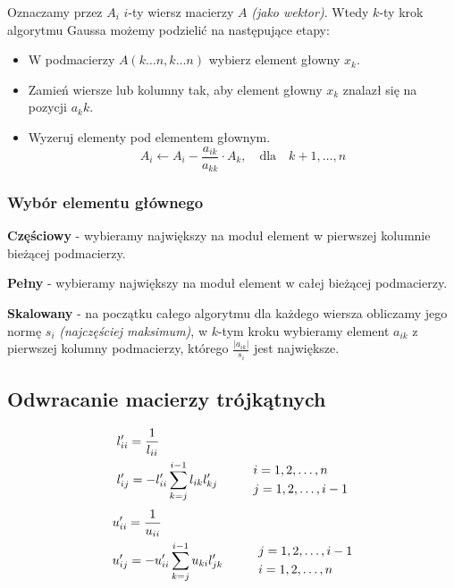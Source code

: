 \documentclass[../mn-notatki.tex]{subfiles}
\begin{document}
Oznaczamy przez $A_i$ $i$-ty wiersz macierzy $A$ \textit{(jako wektor)}.
Wtedy $k$-ty krok algorytmu Gaussa możemy podzielić na następujące etapy:
\begin{itemize}
    \item W podmacierzy $A(k\ldots n, k\ldots n)$ wybierz element głowny $x_k$.
    \item Zamień wiersze lub kolumny tak, aby element głowny $x_k$ znalazł się
    na pozycji $a_kk$.
    \item Wyzeruj elementy pod elementem głownym.
    \[
    A_i \leftarrow A_i - \frac{a_{ik}}{a_{kk}} \cdot A_k, \text{~~ dla ~~} k+1, \ldots, n
    \]
\end{itemize}

\subsubsection{Wybór elementu głównego}

\begin{tcolorbox}
\textbf{Częściowy} - wybieramy największy na moduł element w pierwszej kolumnie
bieżącej podmacierzy.
\end{tcolorbox}

\begin{tcolorbox}
\textbf{Pełny} - wybieramy największy na moduł element w całej
bieżącej podmacierzy.
\end{tcolorbox}

\begin{tcolorbox}
\textbf{Skalowany} - na początku całego algorytmu dla każdego wiersza obliczamy
jego normę $s_i$ \textit{(najczęściej maksimum)}, w $k$-tym kroku wybieramy
element $a_{ik}$ z pierwszej kolumny podmacierzy, którego
$\frac{|a_{ik}|}{s_i}$ jest największe.
\end{tcolorbox}

\subsection{Odwracanie macierzy trójkątnych}

\begin{align*}
&l_{ii}' = \frac{1}{l_{ii}}\\
&l_{ij}' = -l_{ii}' \sum_{k=j}^{i-1} l_{ik} l_{kj}' \hspace*{1cm} \begin{aligned}
&i = 1, 2, \ldots, n\\
&j = 1, 2, \ldots, i -1
\end{aligned}
\end{align*}
\begin{align*}
&u_{ii}' = \frac{1}{u_{ii}}\\
&u_{ij}' = -u_{ii}' \sum_{k=j}^{i-1} u_{ki} l_{jk}' \hspace*{1cm} \begin{aligned}
&j = 1, 2, \ldots, i -1\\
&i = 1, 2, \ldots, n
\end{aligned}
\end{align*}
\end{document}
